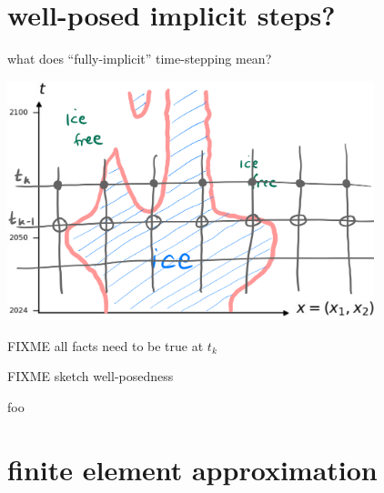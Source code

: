 \documentclass[10pt,dvipsnames]{beamer}
\newcommand{\viewin}[1]{{\footnotesize \emph{this view appears in} #1}}
\begin{document}


\section{well-posed implicit steps?}

\begin{frame}{what does ``fully-implicit'' time-stepping mean?}

\begin{center}
\includegraphics[width=0.8\textwidth]{implicitstep}
\end{center}

\medskip
FIXME all facts need to be true at $t_k$
\end{frame}


\begin{frame}{FIXME sketch well-posedness}

foo
\end{frame}


\section{finite element approximation}
\end{document}
